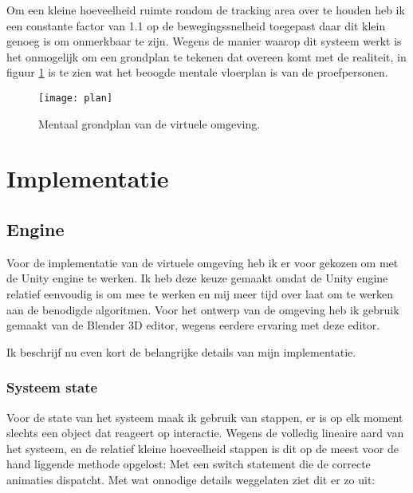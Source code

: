 Om een kleine hoeveelheid ruimte rondom de tracking area over te houden heb ik
een constante factor van 1.1 op de bewegingssnelheid toegepast daar dit klein 
genoeg is om onmerkbaar te zijn\cite{steinicke09}. Wegens de manier waarop dit 
systeem werkt is het onmogelijk om een grondplan te tekenen dat overeen komt met 
de realiteit, in figuur \ref{fig:plan} is te zien wat het beoogde mentale 
vloerplan is van de proefpersonen.

\begin{figure}[h!]
    \centering
    \texttt{[image: plan]}
    \caption{Mentaal grondplan van de virtuele omgeving.}
    \label{fig:plan}
\end{figure}


\section{Implementatie}
\subsection{Engine}
Voor de implementatie van de virtuele omgeving heb ik er voor gekozen om met de
Unity engine te werken. Ik heb deze keuze gemaakt omdat de Unity engine relatief
eenvoudig is om mee te werken en mij meer tijd over laat om te werken aan de
benodigde algoritmen. Voor het ontwerp van de omgeving heb ik gebruik gemaakt 
van de Blender 3D editor, wegens eerdere ervaring met deze editor.

Ik beschrijf nu even kort de belangrijke details van mijn implementatie.


\subsubsection{Systeem state}
Voor de state van het systeem maak ik gebruik van stappen, er is op elk moment
slechts een object dat reageert op interactie. Wegens de volledig lineaire aard
van het systeem, en de relatief kleine hoeveelheid stappen is dit op de meest 
voor de hand liggende methode opgelost: Met een switch statement die de correcte
animaties dispatcht. Met wat onnodige details weggelaten ziet dit er zo uit:

